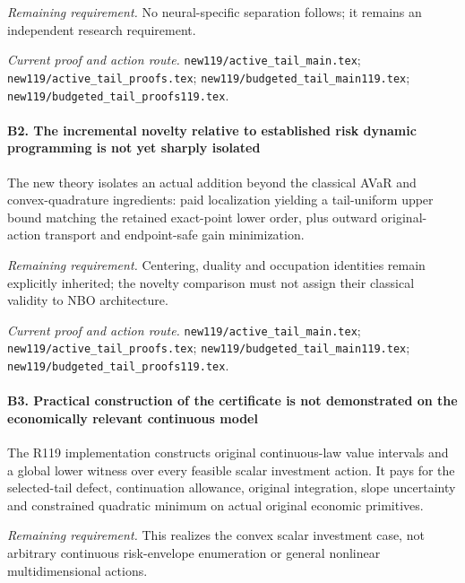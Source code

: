 \par\emph{Remaining requirement.} No neural-specific separation follows; it remains an independent research requirement.

\par\emph{Current proof and action route.} \nolinkurl{new119/active_tail_main.tex}; \nolinkurl{new119/active_tail_proofs.tex}; \nolinkurl{new119/budgeted_tail_main119.tex}; \nolinkurl{new119/budgeted_tail_proofs119.tex}.

\paragraph{B2. The incremental novelty relative to established risk dynamic programming is not yet sharply isolated}

The new theory isolates an actual addition beyond the classical AVaR and convex-quadrature ingredients: paid localization yielding a tail-uniform upper bound matching the retained exact-point lower order, plus outward original-action transport and endpoint-safe gain minimization.

\par\emph{Remaining requirement.} Centering, duality and occupation identities remain explicitly inherited; the novelty comparison must not assign their classical validity to NBO architecture.

\par\emph{Current proof and action route.} \nolinkurl{new119/active_tail_main.tex}; \nolinkurl{new119/active_tail_proofs.tex}; \nolinkurl{new119/budgeted_tail_main119.tex}; \nolinkurl{new119/budgeted_tail_proofs119.tex}.

\paragraph{B3. Practical construction of the certificate is not demonstrated on the economically relevant continuous model}

The R119 implementation constructs original continuous-law value intervals and a global lower witness over every feasible scalar investment action. It pays for the selected-tail defect, continuation allowance, original integration, slope uncertainty and constrained quadratic minimum on actual original economic primitives.

\par\emph{Remaining requirement.} This realizes the convex scalar investment case, not arbitrary continuous risk-envelope enumeration or general nonlinear multidimensional actions.

